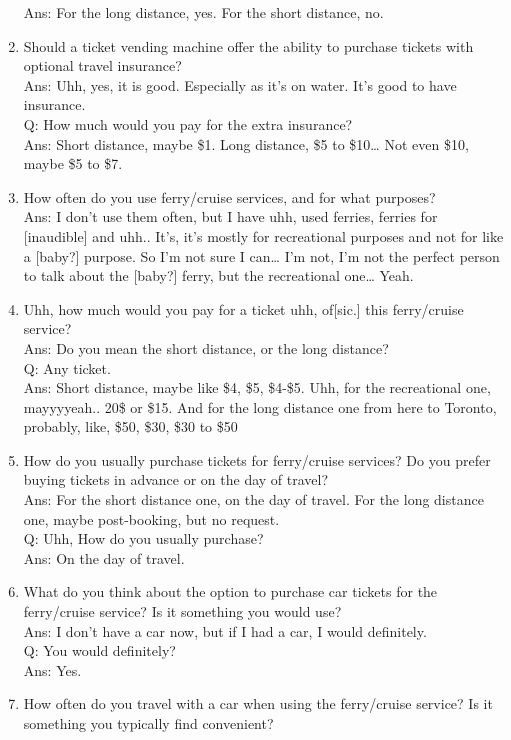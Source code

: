 \begin{enumerate}
Ans: For the long distance, yes. For the short distance, no.
    \item Should a ticket vending machine offer the ability to purchase tickets with optional travel insurance?\\
Ans: Uhh, yes, it is good. Especially as it’s on water. It’s good to have insurance.\\
Q: How much would you pay for the extra insurance?\\
Ans: Short distance, maybe \$1. Long distance, \$5 to \$10… Not even \$10, maybe \$5 to \$7.
    \item How often do you use ferry/cruise services, and for what purposes?\\
Ans: I don’t use them often, but I have uhh, used ferries, ferries for [inaudible] and uhh.. It’s, it’s mostly for recreational purposes and not for like a [baby?] purpose. So I’m not sure I can… I’m not, I’m not the perfect person to talk about the [baby?] ferry, but the recreational one… Yeah.
    \item Uhh, how much would you pay for a ticket uhh, of[sic.] this ferry/cruise service? \\
Ans: Do you mean the short distance, or the long distance?\\
Q: Any ticket.\\
Ans: Short distance, maybe like \$4, \$5, \$4-\$5. Uhh, for the recreational one, mayyyyeah.. 20\$ or \$15. And for the long distance one from here to Toronto, probably, like, \$50, \$30, \$30 to \$50
    \item How do you usually purchase tickets for ferry/cruise services? Do you prefer buying tickets in advance or on the day of travel?\\
Ans: For the short distance one, on the day of travel. For the long distance one, maybe post-booking, but no request.\\
Q: Uhh, How do you usually purchase?\\
Ans: On the day of travel.
    \item What do you think about the option to purchase car tickets for the ferry/cruise service? Is it something you would use?\\
Ans: I don’t have a car now, but if I had a car, I would definitely.\\
Q: You would definitely?\\
Ans: Yes.
    \item How often do you travel with a car when using the ferry/cruise service? Is it something you typically find convenient?\\

\end{enumerate}
